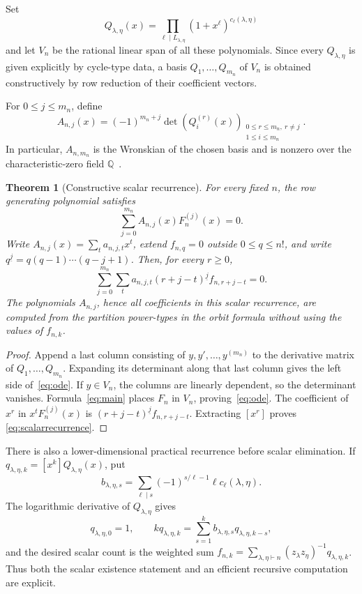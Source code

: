 \documentclass[11pt]{article}
\newtheorem{theorem}{Theorem}
\begin{document}
Set
\[
 Q_{\lambda,\eta}(x)=
 \prod_{\ell\mid L_{\lambda,\eta}}
 (1+x^\ell)^{c_\ell(\lambda,\eta)}
\]
and let $V_n$ be the rational linear span of all these polynomials. Since
every $Q_{\lambda,\eta}$ is given explicitly by cycle-type data, a basis
$Q_1,\ldots,Q_{m_n}$ of $V_n$ is obtained constructively by row reduction
of their coefficient vectors.

For $0\leq j\leq m_n$, define
\begin{equation}\label{eq:Aj}
A_{n,j}(x)=(-1)^{m_n+j}
\det\!\left(Q_i^{(r)}(x)\right)_{
\substack{0\leq r\leq m_n,\ r\neq j\\1\leq i\leq m_n}}.
\end{equation}
In particular, $A_{n,m_n}$ is the Wronskian of the chosen basis and is
nonzero over the characteristic-zero field $\mathbb Q$~\cite{Ince}.

\begin{theorem}[Constructive scalar recurrence]\label{thm:recurrence}
For every fixed $n$, the row generating polynomial satisfies
\begin{equation}\label{eq:ode}
 \sum_{j=0}^{m_n}A_{n,j}(x)F_n^{(j)}(x)=0.
\end{equation}
Write $A_{n,j}(x)=\sum_t a_{n,j,t}x^t$, extend $f_{n,q}=0$ outside
$0\leq q\leq n!$, and write
$q^{\underline{j}}=q(q-1)\cdots(q-j+1)$. Then, for every $r\geq0$,
\begin{equation}\label{eq:scalarrecurrence}
\boxed{
\sum_{j=0}^{m_n}\sum_t
a_{n,j,t}(r+j-t)^{\underline{j}}f_{n,r+j-t}=0.}
\end{equation}
The polynomials $A_{n,j}$, hence all coefficients in this scalar recurrence,
are computed from the partition power-types in the orbit formula without
using the values of $f_{n,k}$.
\end{theorem}

\begin{proof}
Append a last column consisting of $y,y',\ldots,y^{(m_n)}$ to the derivative
matrix of $Q_1,\ldots,Q_{m_n}$. Expanding its determinant along that last
column gives the left side of~\eqref{eq:ode}. If $y\in V_n$, the columns are
linearly dependent, so the determinant vanishes. Formula~\eqref{eq:main}
places $F_n$ in $V_n$, proving~\eqref{eq:ode}. The coefficient of $x^r$ in
$x^tF_n^{(j)}(x)$ is
$(r+j-t)^{\underline{j}}f_{n,r+j-t}$. Extracting $[x^r]$ proves
\eqref{eq:scalarrecurrence}.
\end{proof}

There is also a lower-dimensional practical recurrence before scalar
elimination. If
$q_{\lambda,\eta,k}=[x^k]Q_{\lambda,\eta}(x)$, put
\[
b_{\lambda,\eta,s}=
\sum_{\ell\mid s}(-1)^{s/\ell-1}\ell c_\ell(\lambda,\eta).
\]
The logarithmic derivative of $Q_{\lambda,\eta}$ gives
\begin{equation}\label{eq:auxrecurrence}
q_{\lambda,\eta,0}=1,\qquad
kq_{\lambda,\eta,k}=
\sum_{s=1}^{k}b_{\lambda,\eta,s}q_{\lambda,\eta,k-s},
\end{equation}
and the desired scalar count is the weighted sum
$f_{n,k}=\sum_{\lambda,\eta\vdash n}(z_\lambda z_\eta)^{-1}
q_{\lambda,\eta,k}$. Thus both the scalar existence statement and an
efficient recursive computation are explicit.
\end{document}
